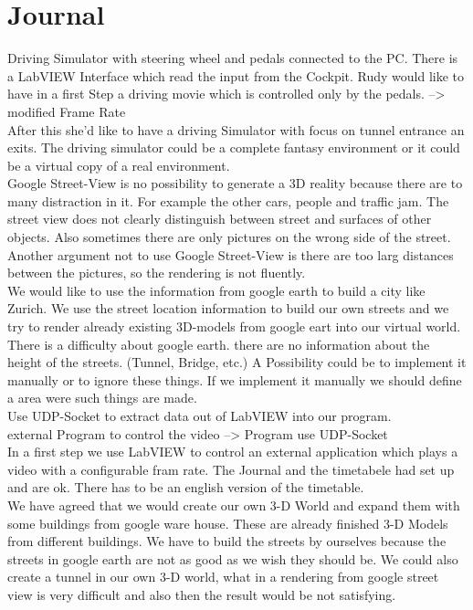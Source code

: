 \section{Journal}
Driving Simulator with steering wheel and pedals connected to the PC. There is a LabVIEW Interface which read the input from the Cockpit. Rudy would like to have in a first Step a driving movie which is controlled only by the pedals. --> modified Frame Rate \\
After this she'd like to have a driving Simulator with focus on tunnel entrance an exits.  
The driving simulator could be a complete fantasy environment or it could be a virtual copy of a real environment. \\
Google Street-View is no possibility to generate a 3D reality because there are to many distraction in it. For example the other cars, people and traffic jam. The street view does not clearly distinguish between street and surfaces of other objects. Also sometimes there are only pictures on the wrong side of the street.  Another argument not to use Google Street-View is there are too larg distances between the pictures, so the rendering is not fluently.\\
We would like to use the information from google earth to build a city like Zurich. We use the street location information to build our own streets and we try to render already existing 3D-models from google eart into our virtual world. \\
There is a difficulty about google earth. there are no information about the height of the streets. (Tunnel, Bridge, etc.) A Possibility could be to implement it manually or to ignore these things. If we implement it manually we should define a area were such things are made. \\
Use UDP-Socket to extract data out of LabVIEW into our program. \\
external Program to control the video --> Program use UDP-Socket\\
In a first step we use LabVIEW to control an external application which plays a video with a configurable fram rate. 
The Journal and the timetabele had set up and are ok. There has to be an english version of the timetable. \\
We have agreed that we would create  our own 3-D World and expand them with some buildings from google ware house. These are already finished 3-D Models from different buildings. We have to build the streets by ourselves because the streets in google earth are not as good as we wish they should be. We could also create a tunnel in our own 3-D world, what in a rendering from google street view is very difficult and also then the result would be not satisfying. \\
